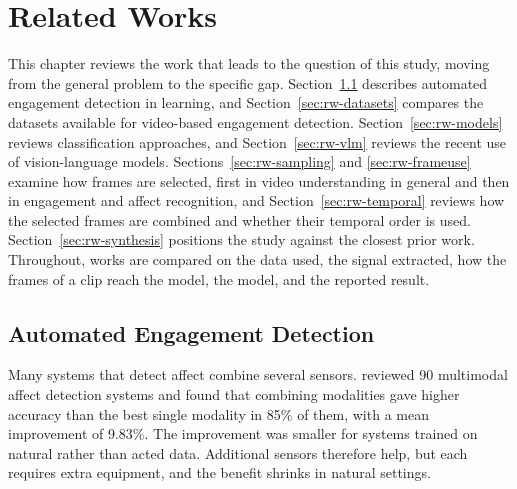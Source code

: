 %
%
%

\chapter{Related Works}
\label{sec:relatedworks}

This chapter reviews the work that leads to the question of this study, moving from the general problem to the specific gap. Section~\ref{sec:rw-detection} describes automated engagement detection in learning, and Section~\ref{sec:rw-datasets} compares the datasets available for video-based engagement detection. Section~\ref{sec:rw-models} reviews classification approaches, and Section~\ref{sec:rw-vlm} reviews the recent use of vision-language models. Sections~\ref{sec:rw-sampling} and \ref{sec:rw-frameuse} examine how frames are selected, first in video understanding in general and then in engagement and affect recognition, and Section~\ref{sec:rw-temporal} reviews how the selected frames are combined and whether their temporal order is used. Section~\ref{sec:rw-synthesis} positions the study against the closest prior work. Throughout, works are compared on the data used, the signal extracted, how the frames of a clip reach the model, the model, and the reported result.



\section{Automated Engagement Detection}
\label{sec:rw-detection}

Many systems that detect affect combine several sensors.  reviewed 90 multimodal affect detection systems and found that combining modalities gave higher accuracy than the best single modality in 85\% of them, with a mean improvement of 9.83\%. The improvement was smaller for systems trained on natural rather than acted data. Additional sensors therefore help, but each requires extra equipment, and the benefit shrinks in natural settings.

